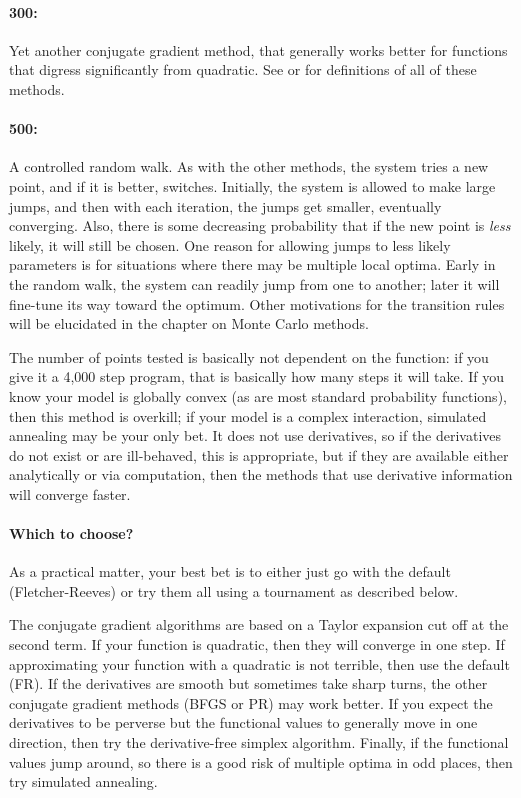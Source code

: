 \paragraph{300: } Yet another
conjugate gradient method, that generally works better for functions
that digress significantly from quadratic.  See \citet[thorough, mathematician audience]{avriel:nonlinear}
or \citet[practical, modeling audience]{practical:optimization}  for definitions of all of these methods.

\paragraph{500: } A controlled random walk.
As with the other methods, the system tries a new point, and if it
is better, switches. Initially, the system is allowed to make large
jumps, and then with each iteration, the jumps get smaller, eventually
converging. Also, there is some decreasing probability that if the new
point is {\em less} likely, it will still be chosen. One reason for
allowing jumps to less likely parameters is for
situations where there may be multiple local optima. Early
in the random walk, the system can readily jump from one to another;
later it will fine-tune its way toward the optimum. Other motivations
for the transition rules will be elucidated in the chapter on Monte
Carlo methods.

The number of points tested is basically not dependent on the function:
if you give it a 4,000 step program, that is basically how many steps
it will take.  If you know your model is globally convex (as are most
standard probability functions), then this method is overkill; if your
model is a complex interaction, simulated annealing may be your only
bet. It does not use derivatives, so if the derivatives do not exist or
are ill-behaved, this is appropriate, but if they are available either
analytically or via computation, then the methods that use derivative
information will converge faster.

\paragraph{Which to choose?}
As a practical matter, your best bet is to either just go with the default
(Fletcher-Reeves) or try them all using a tournament as described below.

The conjugate gradient algorithms are based on a Taylor expansion cut
off at the second term. If your function is quadratic, then they will
converge in one step.  
If approximating your function with a quadratic is not terrible, then
use the default (FR). If the derivatives are smooth but sometimes take sharp
turns, the other conjugate gradient methods (BFGS or PR) may work
better. If you expect the derivatives to be perverse but the functional
values to generally move in one direction, then 
try the derivative-free simplex algorithm. Finally, if the functional
values jump around, so there is a good risk of multiple
optima in odd places, then try simulated annealing.

